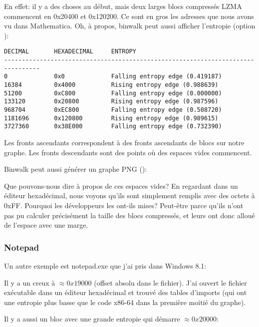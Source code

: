 En effet: il y a des choses au début, mais deux larges blocs compressés LZMA
commencent en 0x20400 et 0x120200.
Ce sont en gros les adresses que nous avons vu dans Mathematica.
Oh, à propos, binwalk peut aussi afficher l'entropie (option ):

\begin{lstlisting}
DECIMAL       HEXADECIMAL     ENTROPY
--------------------------------------------------------------------------------
0             0x0             Falling entropy edge (0.419187)
16384         0x4000          Rising entropy edge (0.988639)
51200         0xC800          Falling entropy edge (0.000000)
133120        0x20800         Rising entropy edge (0.987596)
968704        0xEC800         Falling entropy edge (0.508720)
1181696       0x120800        Rising entropy edge (0.989615)
3727360       0x38E000        Falling entropy edge (0.732390)
\end{lstlisting}

Les fronts ascendants correspondent à des fronts ascendants de blocs sur notre graphe.
Les fronts descendants sont des points où des espaces vides commencent.

Binwalk peut aussi générer un graphe PNG ():



Que pouvons-nous dire à propos de ces espaces vides? En regardant dans un éditeur hexadécimal,
nous voyons qu'ils sont simplement remplis avec des octets à 0xFF.
Pourquoi les développeurs les ont-ils mises?
Peut-être parce qu'ils n'ont pas pu calculer précisément la taille des blocs compressés,
et leurs ont donc alloué de l'espace avec une marge.

\subsubsection{Notepad}


Un autre exemple est notepad.exe que j'ai pris dans Windows 8.1:



Il y a un creux à $\approx 0x19000$ (offset absolu dans le fichier).
J'ai ouvert le fichier exécutable dans un éditeur hexadécimal et trouvé des tables
d'imports (qui ont une entropie plus basse que le code x86-64 dans la première moitié
du graphe).

Il y a aussi un bloc avec une grande entropie qui démarre $\approx 0x20000$:

